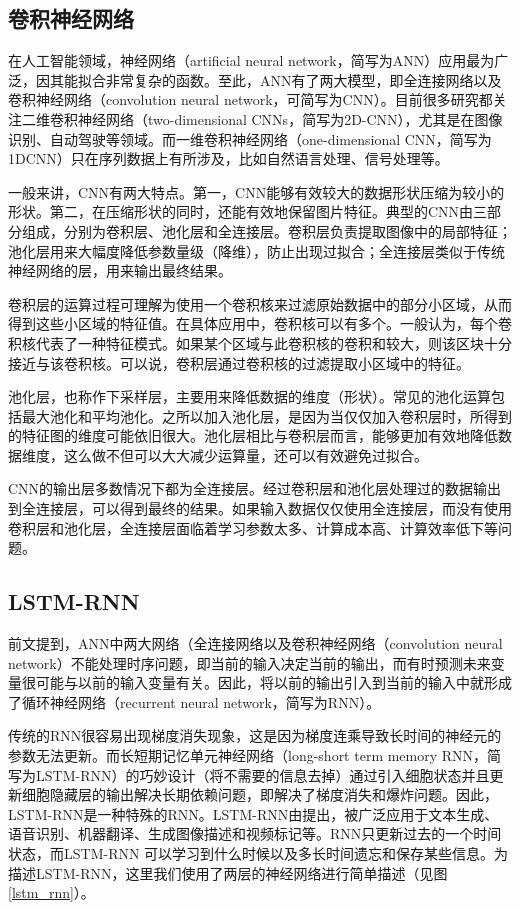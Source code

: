 \subsection{卷积神经网络}\label{sec:卷积神经网络}

在人工智能领域，神经网络（artificial neural network，简写为ANN）应用最为广泛，因其能拟合非常复杂的函数。至此，ANN有了两大模型，即全连接网络以及卷积神经网络（convolution neural network，可简写为CNN）。目前很多研究都关注二维卷积神经网络（two-dimensional CNNs，简写为2D-CNN），尤其是在图像识别、自动驾驶等领域。而一维卷积神经网络（one-dimensional CNN，简写为1DCNN）只在序列数据上有所涉及，比如自然语言处理、信号处理等。

一般来讲，CNN有两大特点。第一，CNN能够有效较大的数据形状压缩为较小的形状。第二，在压缩形状的同时，还能有效地保留图片特征。典型的CNN由三部分组成，分别为卷积层、池化层和全连接层。卷积层负责提取图像中的局部特征；池化层用来大幅度降低参数量级（降维），防止出现过拟合；全连接层类似于传统神经网络的层，用来输出最终结果。

卷积层的运算过程可理解为使用一个卷积核来过滤原始数据中的部分小区域，从而得到这些小区域的特征值。在具体应用中，卷积核可以有多个。一般认为，每个卷积核代表了一种特征模式。如果某个区域与此卷积核的卷积和较大，则该区块十分接近与该卷积核。可以说，卷积层通过卷积核的过滤提取小区域中的特征。

池化层，也称作下采样层，主要用来降低数据的维度（形状）。常见的池化运算包括最大池化和平均池化。之所以加入池化层，是因为当仅仅加入卷积层时，所得到的特征图的维度可能依旧很大。池化层相比与卷积层而言，能够更加有效地降低数据维度，这么做不但可以大大减少运算量，还可以有效避免过拟合。

CNN的输出层多数情况下都为全连接层。经过卷积层和池化层处理过的数据输出到全连接层，可以得到最终的结果。如果输入数据仅仅使用全连接层，而没有使用卷积层和池化层，全连接层面临着学习参数太多、计算成本高、计算效率低下等问题。


\subsection{LSTM-RNN}\label{sec:LSTM-RNN}

前文提到，ANN中两大网络（全连接网络以及卷积神经网络（convolution neural network）不能处理时序问题，即当前的输入决定当前的输出，而有时预测未来变量很可能与以前的输入变量有关。因此，将以前的输出引入到当前的输入中就形成了循环神经网络（recurrent neural network，简写为RNN）。

传统的RNN很容易出现梯度消失现象，这是因为梯度连乘导致长时间的神经元的参数无法更新。而长短期记忆单元神经网络（long-short term memory RNN，简写为LSTM-RNN）的巧妙设计（将不需要的信息去掉）通过引入细胞状态并且更新细胞隐藏层的输出解决长期依赖问题，即解决了梯度消失和爆炸问题。因此，LSTM-RNN是一种特殊的RNN。LSTM-RNN由\citep{hochreiter1997long}提出，被广泛应用于文本生成、语音识别、机器翻译、生成图像描述和视频标记等。RNN只更新过去的一个时间状态，而LSTM-RNN 可以学习到什么时候以及多长时间遗忘和保存某些信息。为描述LSTM-RNN，这里我们使用了两层的神经网络进行简单描述（见图\ref{lstm_rnn}）。

